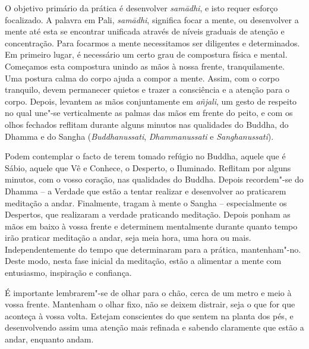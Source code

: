O objetivo primário da prática é desenvolver \emph{samādhi}, e isto
requer esforço focalizado. A palavra em Pali, \emph{samādhi},
significa focar a mente, ou desenvolver a mente até esta se encontrar
unificada através de níveis graduais de atenção e concentração. Para
focarmos a mente necessitamos ser diligentes e determinados. Em primeiro
lugar, é necessário um certo grau de compostura física e mental.
Começamos esta compostura unindo as mãos à nossa frente, tranquilamente.
Uma postura calma do corpo ajuda a compor a mente. Assim, com o corpo
tranquilo, devem permanecer quietos e trazer a consciência e a atenção
para o corpo. Depois, levantem as mãos conjuntamente em \emph{añjali},
um gesto de respeito no qual une"-se verticalmente as palmas das mãos em
frente do peito, e com os olhos fechados reflitam durante alguns minutos
nas qualidades do Buddha, do Dhamma e do Sangha
(\emph{Buddhanussati}, \emph{Dhammanussati} e \emph{Sanghanussati}).

Podem contemplar o facto de terem tomado refúgio no Buddha,
aquele que é Sábio, aquele que Vê e Conhece, o Desperto, o Iluminado.
Reflitam por alguns minutos, com o vosso coração, nas qualidades do
Buddha. Depois recordem"-se do Dhamma -- a Verdade que
estão a tentar realizar e desenvolver ao praticarem meditação a andar.
Finalmente, tragam à mente o Sangha -- especialmente os
Despertos, que realizaram a verdade praticando meditação. Depois ponham
as mãos em baixo à vossa frente e determinem mentalmente durante quanto
tempo irão praticar meditação a andar, seja meia hora, uma hora ou mais.
Independentemente do tempo que determinaram para a prática,
mantenham"-no. Deste modo, nesta fase inicial da meditação, estão a
alimentar a mente com entusiasmo, inspiração e confiança.

É importante lembrarem"-se de olhar para o chão, cerca de um metro e meio
à vossa frente. Mantenham o olhar fixo, não se deixem distrair, seja o
que for que aconteça à vossa volta. Estejam conscientes do que sentem na
planta dos pés, e desenvolvendo assim uma atenção mais refinada e
sabendo claramente que estão a andar, enquanto andam.

